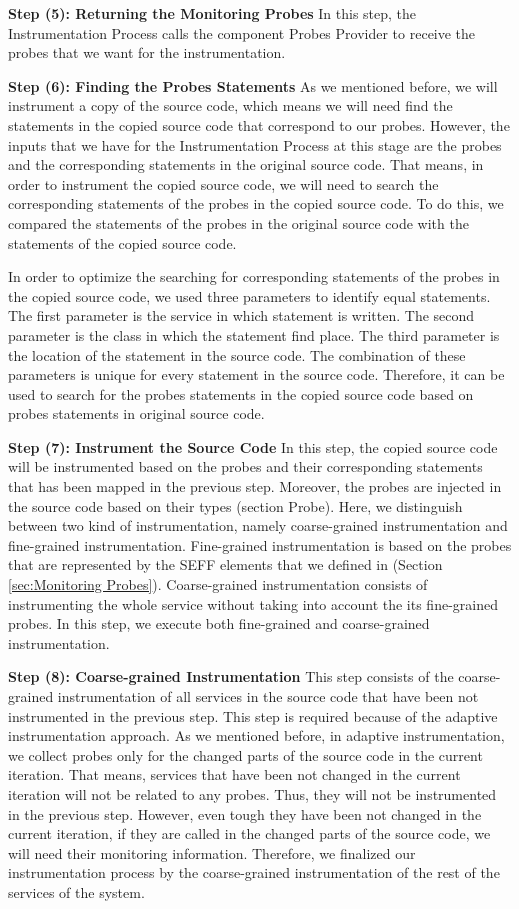 \textbf{Step (5): Returning the Monitoring Probes}
In this step, the Instrumentation Process calls the component Probes Provider to receive the probes that we want for the instrumentation.

\textbf{Step (6): Finding the Probes Statements}
As we mentioned before, we will instrument a copy of the source code, which means we will need find the statements in the copied source code that correspond to our probes. However, the inputs that we have for the Instrumentation Process at this stage are the probes and the corresponding statements in the original source code. That means, in order to instrument the copied source code, we will need to search the corresponding statements of the probes in the copied source code. To do this, we compared the statements of the probes in the original source code with the statements of the copied source code. 

In order to optimize the searching for corresponding statements of the probes in the copied source code, we used three parameters to identify equal statements. The first parameter is the service in which statement is written. The second parameter is the class in which the statement find place. The third parameter is the location of the statement in the source code. The combination of these parameters is unique for every statement in the source code. Therefore, it can be used to search for the probes statements in the copied source code based on probes statements in original source code. 

\textbf{Step (7): Instrument the Source Code}
In this step, the copied source code will be instrumented based on the probes and their corresponding statements that has been mapped in the previous step. Moreover, the probes are injected in the source code based on their types (section Probe).  Here, we distinguish between two kind of instrumentation, namely coarse-grained instrumentation and fine-grained instrumentation. Fine-grained instrumentation is based on the probes that are represented by the SEFF elements that we defined in (Section \ref{sec:Monitoring Probes}). Coarse-grained instrumentation consists of instrumenting the whole service without taking into account the its fine-grained probes. In this step, we execute both fine-grained and coarse-grained instrumentation. 

\textbf{Step (8): Coarse-grained Instrumentation}
This step consists of the coarse-grained instrumentation of all services in the source code that have been not instrumented in the previous step.  This step is required because of the adaptive instrumentation approach. As we mentioned before, in adaptive instrumentation, we collect probes only for the changed parts of the source code in the current iteration. That means, services that have been not changed in the current iteration will not be related to any probes. Thus, they will not be instrumented in the previous step. However, even tough they have been not changed in the current iteration, if they are called in the changed parts of the source code, we will need their monitoring information. Therefore, we finalized our instrumentation process by the coarse-grained instrumentation of the rest of the services of the system.  

